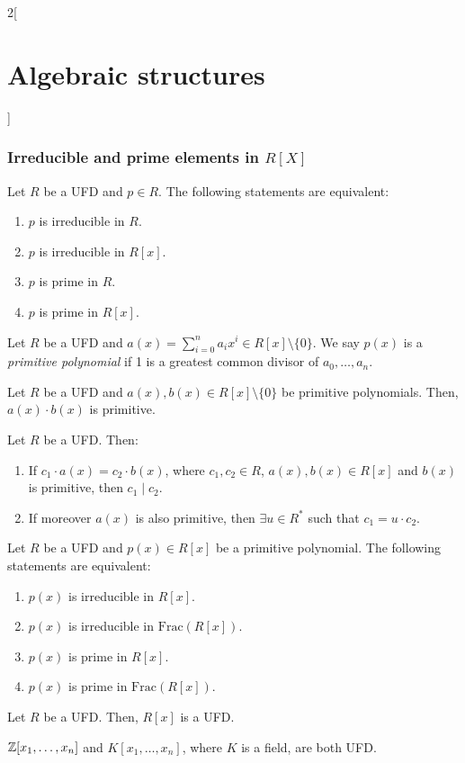 \documentclass[../../../main.tex]{subfiles}
\begin{document}
\begin{multicols}{2}[\section{Algebraic structures}]
\subsubsection{Irreducible and prime elements in $R[X]$}
\begin{prop}
    Let $R$ be a UFD and $p\in R$. The following statements are equivalent:
    \begin{enumerate}
        \item $p$ is irreducible in $R$.
        \item $p$ is irreducible in $R[x]$.
        \item $p$ is prime in $R$.
        \item $p$ is prime in $R[x]$.
    \end{enumerate}
\end{prop}
\begin{definition}
    Let $R$ be a UFD and $a(x)=\sum_{i=0}^na_ix^i\in R[x]\setminus\{0\}$. We say $p(x)$ is a \textit{primitive polynomial} if 1 is a greatest common divisor of $a_0,\ldots,a_n$.
\end{definition}
\begin{lemma}
    Let $R$ be a UFD and $a(x),b(x)\in R[x]\setminus\{0\}$ be primitive polynomials. Then, $a(x)\cdot b(x)$ is primitive.
\end{lemma}
\begin{lemma}
    Let $R$ be a UFD. Then:
    \begin{enumerate}
        \item If $c_1\cdot a(x)=c_2\cdot b(x)$, where $c_1,c_2\in R$, $a(x),b(x)\in R[x]$ and $b(x)$ is primitive, then $c_1\mid c_2$.
        \item If moreover $a(x)$ is also primitive, then $\exists u\in R^*$ such that $c_1=u\cdot c_2$.
    \end{enumerate}
\end{lemma}
\begin{prop}
    Let $R$ be a UFD and $p(x)\in R[x]$ be a primitive polynomial. The following statements are equivalent:
    \begin{enumerate}
        \item $p(x)$ is irreducible in $R[x]$.
        \item $p(x)$ is irreducible in $\mathrm{Frac}(R[x])$.
        \item $p(x)$ is prime in $R[x]$.
        \item $p(x)$ is prime in $\mathrm{Frac}(R[x])$.
    \end{enumerate}
\end{prop}
\begin{theorem}
    Let $R$ be a UFD. Then, $R[x]$ is a UFD.
\end{theorem}
\begin{corollary}
    $\mathbb{Z}[x_1,\ldots,x_n]$ and $K[x_1,\ldots,x_n]$, where $K$ is a field, are both UFD.
\end{corollary}

\end{multicols}
\end{document}
